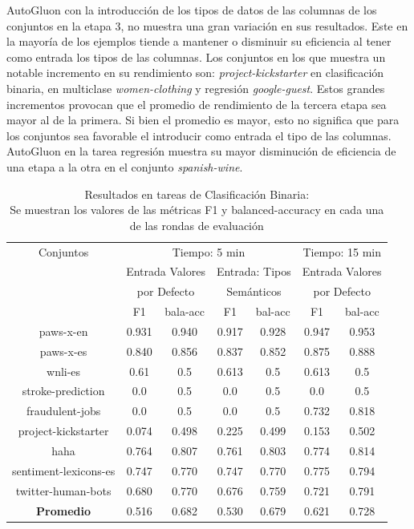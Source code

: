AutoGluon con la introducción de los tipos de datos de las columnas de los conjuntos en la etapa 3, no muestra una gran variación en sus resultados.
Este en la mayoría de los ejemplos tiende a mantener o disminuir su eficiencia al tener como entrada los tipos de las columnas. Los conjuntos en los que muestra un 
notable incremento en su rendimiento son: \textit{project-kickstarter} en clasificación binaria, en multiclase \textit{women-clothing} y regresión 
\textit{google-guest}. Estos grandes incrementos provocan que el promedio de rendimiento de la tercera etapa sea mayor al de la primera. Si bien el promedio es mayor, 
esto no significa que para los conjuntos sea favorable el introducir como entrada el tipo de las columnas. 
AutoGluon en la tarea regresión muestra su mayor disminución de eficiencia de una etapa a la otra en el conjunto \textit{spanish-wine}.

\begin{table}
  \centering
  \resizebox{15cm}{!} {
  \begin{tabular}{|c|cccccc|}
  \hline
  Conjuntos & \multicolumn{4}{P{8cm}|}{Tiempo: 5 min}  & \multicolumn{2}{P{4cm}|}{Tiempo: 15 min}\\  
    \cline{2-7}
  & \multicolumn{2}{P{4cm}|}{Entrada Valores} & \multicolumn{2}{P{4cm}|}{Entrada: Tipos} & \multicolumn{2}{P{4cm}|}{Entrada Valores}\\ 
  & \multicolumn{2}{P{4cm}|}{por Defecto} & \multicolumn{2}{P{4cm}|}{Semánticos} & \multicolumn{2}{P{4cm}|}{por Defecto}\\    
  \cline{2-7}
           & F1 & bala-acc & F1  & bal-acc & F1 & bal-acc  \\ \hline
  paws-x-en             & 0.931 & 0.940 & 0.917 & 0.928 & 0.947 & 0.953 \\
  paws-x-es             & 0.840 & 0.856 & 0.837 & 0.852 & 0.875 & 0.888 \\
  wnli-es               & 0.61  & 0.5   & 0.613 & 0.5   & 0.613 & 0.5   \\ 
  stroke-prediction     & 0.0   & 0.5   & 0.0   & 0.5   & 0.0   & 0.5 \\
  fraudulent-jobs       & 0.0   & 0.5   & 0.0   & 0.5   & 0.732 & 0.818 \\
  project-kickstarter   & 0.074 & 0.498 & 0.225 & 0.499 & 0.153 & 0.502 \\
  haha                  & 0.764 & 0.807 & 0.761 & 0.803 & 0.774 & 0.814 \\
  sentiment-lexicons-es & 0.747 & 0.770 & 0.747 & 0.770 & 0.775 & 0.794 \\ 
  twitter-human-bots    & 0.680 & 0.770 & 0.676 & 0.759 & 0.721 & 0.791 \\ \hline
  \textbf{Promedio}     & 0.516 & 0.682 & 0.530 & 0.679 & 0.621 & 0.728 \\ \hline


  \end{tabular}
  \caption{Resultados en tareas de Clasificación Binaria:
  \\Se muestran los valores de las métricas F1 y balanced-accuracy en cada una de las rondas de evaluación}
  \label{fig:class-binary}
  }
\end{table}

